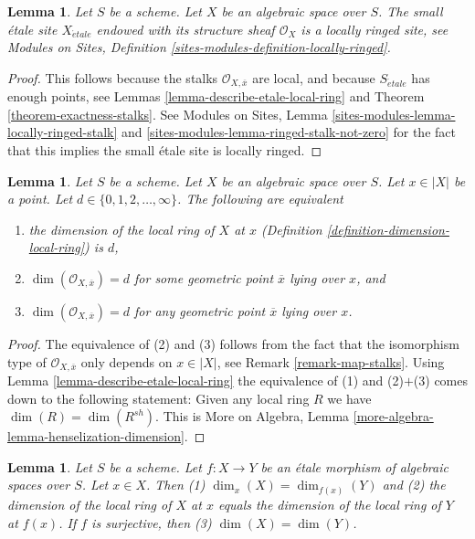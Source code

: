 \documentclass{stacks-project}
\theoremstyle{plain}
\newtheorem{lemma}[subsection]{Lemma}
\theoremstyle{definition}
\theoremstyle{remark}
\numberwithin{equation}{subsection}
\def\etale{{\acute{e}tale}}
\begin{document}
\begin{lemma}
\label{lemma-etale-site-locally-ringed}
Let $S$ be a scheme.
Let $X$ be an algebraic space over $S$.
The small \'etale site $X_\etale$ endowed with its
structure sheaf $\mathcal{O}_X$ is a locally ringed site, see
Modules on Sites, Definition \ref{sites-modules-definition-locally-ringed}.
\end{lemma}

\begin{proof}
This follows because the stalks
$\mathcal{O}_{X, \overline{x}}$ are
local, and because $S_\etale$ has enough points, see
Lemmas \ref{lemma-describe-etale-local-ring} and
Theorem \ref{theorem-exactness-stalks}.
See
Modules on Sites, Lemma \ref{sites-modules-lemma-locally-ringed-stalk} and
\ref{sites-modules-lemma-ringed-stalk-not-zero}
for the fact that this implies the small \'etale site is locally ringed.
\end{proof}

\begin{lemma}
\label{lemma-dimension-local-ring}
Let $S$ be a scheme. Let $X$ be an algebraic space over $S$.
Let $x \in |X|$ be a point. Let $d \in \{0, 1, 2, \ldots, \infty\}$.
The following are equivalent
\begin{enumerate}
\item the dimension of the local ring of $X$ at $x$
(Definition \ref{definition-dimension-local-ring}) is $d$,
\item $\dim(\mathcal{O}_{X, \overline{x}}) = d$ for some geometric
point $\overline{x}$ lying over $x$, and
\item $\dim(\mathcal{O}_{X, \overline{x}}) = d$ for any geometric
point $\overline{x}$ lying over $x$.
\end{enumerate}
\end{lemma}

\begin{proof}
The equivalence of (2) and (3) follows from the fact that the
isomorphism type of $\mathcal{O}_{X, \overline{x}}$ only depends
on $x \in |X|$, see Remark \ref{remark-map-stalks}.
Using Lemma \ref{lemma-describe-etale-local-ring}
the equivalence of (1) and (2)$+$(3) comes down to the
following statement: Given any local ring $R$ we have
$\dim(R) = \dim(R^{sh})$. This is
More on Algebra, Lemma \ref{more-algebra-lemma-henselization-dimension}.
\end{proof}

\begin{lemma}
\label{lemma-dimension-decent-invariant-under-etale}
Let $S$ be a scheme. Let $f : X \to Y$ be an \'etale morphism
of algebraic spaces over $S$. Let $x \in X$. Then
(1) $\dim_x(X) = \dim_{f(x)}(Y)$ and (2) the dimension of
the local ring of $X$ at $x$ equals the dimension of
the local ring of $Y$ at $f(x)$. If $f$ is surjective, then
(3) $\dim(X) = \dim(Y)$.
\end{lemma}
\end{document}
